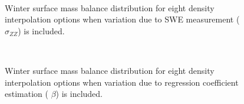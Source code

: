\documentclass[12pt]{article}
\begin{document}
\begin{figure}[H]
	\centering
	\\
	\caption{Winter surface mass balance distribution for eight density interpolation options when variation due to SWE measurement ( $\sigma_{ZZ}$) is included. }
	\label{fig:WSMB_Distributionzz}
\end{figure}
\begin{figure}[H]
	\centering
	\\
	\caption{Winter surface mass balance distribution for eight density interpolation options when variation due to regression coefficient estimation ( $\beta$) is included. }
	\label{fig:WSMB_Distributionbeta}
\end{figure}
\end{document}
